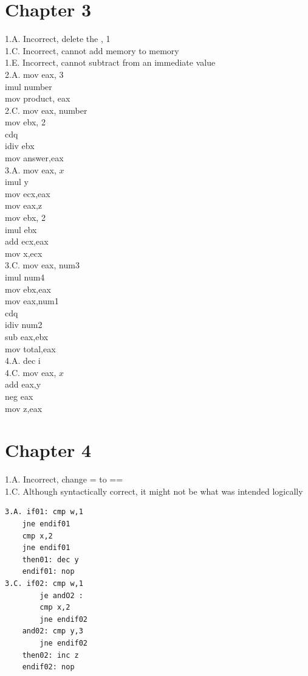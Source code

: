 \documentclass[10pt]{article}
\begin{document}
\section*{Chapter 3}
1.A. Incorrect, delete the , 1\\
1.C. Incorrect, cannot add memory to memory\\
1.E. Incorrect, cannot subtract from an immediate value\\
2.A. mov eax, 3\\
imul number\\
mov product, eax\\
2.C. mov eax, number\\
mov ebx, 2\\
cdq\\
idiv ebx\\
mov answer,eax\\
3.A. mov eax, $x$\\
imul y\\
mov ecx,eax\\
mov eax,z\\
mov ebx, 2\\
imul ebx\\
add ecx,eax\\
mov x,ecx\\
3.C. mov eax, num3\\
imul num4\\
mov ebx,eax\\
mov eax,num1\\
cdq\\
idiv num2\\
sub eax,ebx\\
mov total,eax\\
4.A. dec i\\
4.C. mov eax, $x$\\
add eax,y\\
neg eax\\
mov z,eax

\section*{Chapter 4}
1.A. Incorrect, change = to ==\\
1.C. Although syntactically correct, it might not be what was intended logically

\begin{verbatim}
3.A. if01: cmp w,1
    jne endif01
    cmp x,2
    jne endif01
    then01: dec y
    endif01: nop
3.C. if02: cmp w,1
        je andO2 :
        cmp x,2
        jne endif02
    and02: cmp y,3
        jne endif02
    then02: inc z
    endif02: nop
\end{verbatim}
\end{document}
